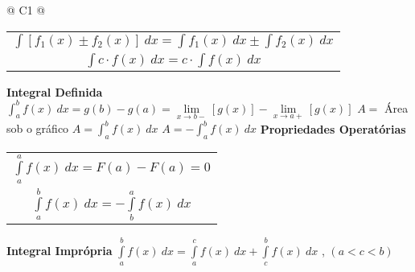 \begin{longtable}{
		@{}
		C{1\textwidth} 
		@{}}
{\begin{tabular}[c]{@{}c@{}}
    			$\int [ f_{1} (x) \pm f_{2} (x) ] \ dx = \int f_{1} (x) \ dx \pm \int f_{2} (x) \ dx$ \\
    			
    			$\int c \cdot f(x) \ dx = c \cdot \int f(x) \ dx$
			
			\end{tabular}}
			\tabularnewline
			\midrule
			\textbf{Integral Definida}
			\tabularnewline
			\midrule
			{\large $ \int_{a}^{b} f(x) \ dx = g(b) - g(a) = \lim \limits_{x \to b-} [g(x)] - \lim \limits_{x \to a+} [g(x)] $}
			\tabularnewline
			\midrule
			{\large $A =$ Área sob o gráfico \hspace{1cm} $A = \int_{a}^{b} f(x) \ dx$ \hspace{1cm} $A = - \int_{a}^{b} f(x) \ dx$}
			\tabularnewline
			\midrule
			\textbf{Propriedades Operatórias}
			\tabularnewline
			\midrule
			{\large \begin{tabular}[c]{@{}c@{}}
			
    			$\int \limits_{a}^{a} f(x) \ dx = F(a) - F(a) = 0$ \\
    			
    			$\int \limits_{a}^{b} f(x) \ dx = - \int \limits_{b}^{a} f(x) \ dx$ 
			
			\end{tabular}}
			\tabularnewline
			\midrule
			\textbf{Integral Imprópria}
			\tabularnewline
			\midrule
			{\large $\int \limits_{a}^{b} f(x) \ dx = \int \limits_{a}^{c} f(x) \ dx + \int \limits_{c}^{b} f(x) \ dx $ , $(a < c < b)$}
			\tabularnewline
			\bottomrule

		\end{longtable}